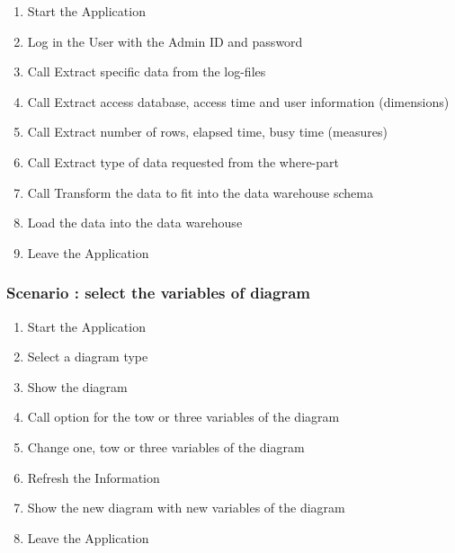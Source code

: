 \begin{enumerate}

\item Start the Application

\item Log in the User with the Admin ID and password

\item Call Extract specific data from the log-files

\item Call Extract access database, access time and user information (dimensions)

\item Call Extract number of rows, elapsed time, busy time (measures)

\item Call Extract type of data requested from the where-part

\item Call Transform the data to fit into the data warehouse schema

\item Load the data into the data warehouse

\item Leave the Application 

\end{enumerate} 

\subsubsection {Scenario : select the variables of diagram} 

\begin{enumerate}

\item Start the Application

\item Select a diagram type

\item Show the diagram

\item Call option for the tow or three variables of the diagram

\item Change one, tow or three variables of the diagram

\item Refresh the Information

\item Show the new diagram with new variables of the diagram

\item Leave the Application

\end{enumerate}

